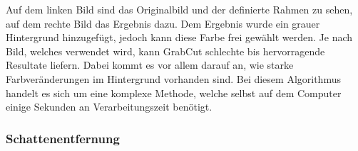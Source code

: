 Auf dem linken Bild sind das Originalbild und der definierte Rahmen zu sehen, auf dem rechte Bild das Ergebnis dazu. Dem Ergebnis wurde ein grauer Hintergrund hinzugefügt, jedoch kann diese Farbe frei gewählt werden. Je nach Bild, welches verwendet wird, kann GrabCut schlechte bis hervorragende Resultate liefern. Dabei kommt es vor allem darauf an, wie starke Farbveränderungen im Hintergrund vorhanden sind. Bei diesem Algorithmus handelt es sich um eine komplexe Methode, welche selbst auf dem Computer einige Sekunden an Verarbeitungszeit benötigt. \cite{GrabCut}

\subsubsection{Schattenentfernung}
